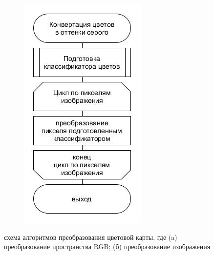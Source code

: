\documentclass[14pt, a4paper]{extreport}
\begin{document}
\begin{figure}[h!]
\begin{subfigure}{.31\textwidth}
			\includegraphics[width = \textwidth]{image/chapter_2/colorclassification2}
			\caption{}
		\end{subfigure}
		\centering
		\caption{схема алгоритмов преобразования цветовой карты, где (a) преобразование пространства RGB; (б) преобразование изображения}
		\label{fig:colorclassification}
	\end{figure}
\end{document}
